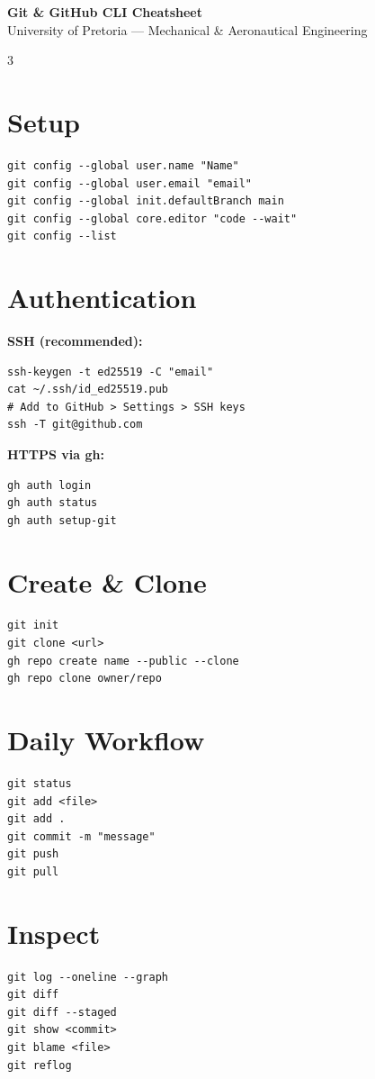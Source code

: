 \documentclass[10pt, a4paper, landscape]{article}
\begin{document}
\begin{center}
  {\Large\bfseries Git \& GitHub CLI Cheatsheet}\\[2pt]
  {\small University of Pretoria --- Mechanical \& Aeronautical Engineering}
\end{center}

\begin{multicols}{3}


\section{Setup}
\begin{verbatim}
git config --global user.name "Name"
git config --global user.email "email"
git config --global init.defaultBranch main
git config --global core.editor "code --wait"
git config --list
\end{verbatim}

\section{Authentication}
\textbf{SSH (recommended):}
\begin{verbatim}
ssh-keygen -t ed25519 -C "email"
cat ~/.ssh/id_ed25519.pub
# Add to GitHub > Settings > SSH keys
ssh -T git@github.com
\end{verbatim}

\textbf{HTTPS via gh:}
\begin{verbatim}
gh auth login
gh auth status
gh auth setup-git
\end{verbatim}

\section{Create \& Clone}
\begin{verbatim}
git init
git clone <url>
gh repo create name --public --clone
gh repo clone owner/repo
\end{verbatim}

\section{Daily Workflow}
\begin{verbatim}
git status
git add <file>
git add .
git commit -m "message"
git push
git pull
\end{verbatim}

\section{Inspect}
\begin{verbatim}
git log --oneline --graph
git diff
git diff --staged
git show <commit>
git blame <file>
git reflog
\end{verbatim}


\end{multicols}
\end{document}
